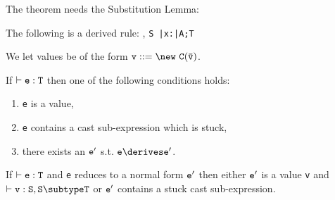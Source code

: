 The theorem needs the Substitution Lemma:
\begin{lemma} The following is a derived rule:
{\Gamma {}, {\tt S \subtype \bar{\tt x}:\bar{\tt A};T}}
\end{lemma}

We let values be of the form $\tt v ::= \new\ C(\bar{\tt v})$. 
\begin{theorem}[Progress]
If $\vdash {\tt e:T}$ then one of the following conditions holds:
\begin{enumerate}
\item {\tt e} is a value,
\item {\tt e} contains a cast sub-expression which is stuck,
\item there exists an $\tt e'$ s.t. $\tt e\derives e'$.
\end{enumerate}
\end{theorem}

\begin{theorem}
If $\vdash {\tt e:T}$ and {\tt e} reduces to a normal form ${\tt e'}$ then
either $\tt e'$ is a value {\tt v} and $\vdash {\tt v:S},{\tt S\subtype T}$ or
${\tt e'}$ contains  a stuck cast sub-expression.
\end{theorem}




